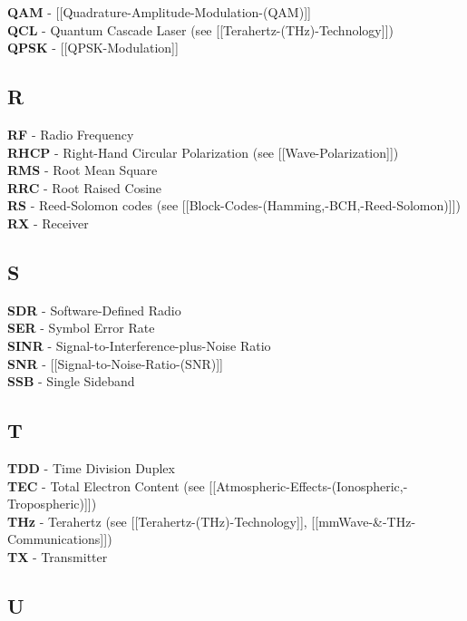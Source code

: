 \textbf{QAM} - {[}{[}Quadrature-Amplitude-Modulation-(QAM){]}{]}\\
\textbf{QCL} - Quantum Cascade Laser (see
{[}{[}Terahertz-(THz)-Technology{]}{]})\\
\textbf{QPSK} - {[}{[}QPSK-Modulation{]}{]}

\subsection{R}\label{r}

\textbf{RF} - Radio Frequency\\
\textbf{RHCP} - Right-Hand Circular Polarization (see
{[}{[}Wave-Polarization{]}{]})\\
\textbf{RMS} - Root Mean Square\\
\textbf{RRC} - Root Raised Cosine\\
\textbf{RS} - Reed-Solomon codes (see
{[}{[}Block-Codes-(Hamming,-BCH,-Reed-Solomon){]}{]})\\
\textbf{RX} - Receiver

\subsection{S}\label{s}

\textbf{SDR} - Software-Defined Radio\\
\textbf{SER} - Symbol Error Rate\\
\textbf{SINR} - Signal-to-Interference-plus-Noise Ratio\\
\textbf{SNR} - {[}{[}Signal-to-Noise-Ratio-(SNR){]}{]}\\
\textbf{SSB} - Single Sideband

\subsection{T}\label{t}

\textbf{TDD} - Time Division Duplex\\
\textbf{TEC} - Total Electron Content (see
{[}{[}Atmospheric-Effects-(Ionospheric,-Tropospheric){]}{]})\\
\textbf{THz} - Terahertz (see {[}{[}Terahertz-(THz)-Technology{]}{]},
{[}{[}mmWave-\&-THz-Communications{]}{]})\\
\textbf{TX} - Transmitter

\subsection{U}\label{u}

